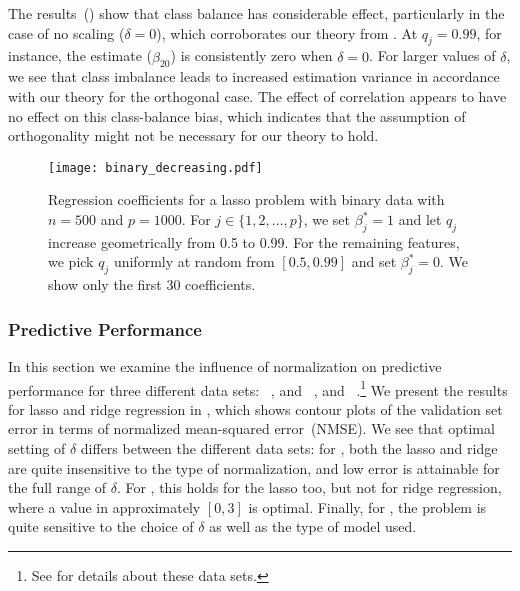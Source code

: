 The results~() show that class balance has considerable effect,
particularly in the case of no scaling (\(\delta = 0\)), which corroborates our theory from
. At \(q_j=0.99\), for instance, the estimate
(\(\hat{\beta}_{20}\)) is consistently zero when \(\delta = 0\). For larger values of
\(\delta\), we see that class imbalance leads to increased estimation variance in
accordance with our theory for the orthogonal case. The effect of correlation appears to
have no effect on this class-balance bias, which indicates that the assumption of
orthogonality might not be necessary for our theory to hold.

\begin{figure}[htpb]
  \centering
  \texttt{[image: binary\_decreasing.pdf]}
  \caption{%
    Regression coefficients for a lasso problem with binary data with \(n = 500\) and \(p =
    \num{1000}\). For \(j \in \{1,2,\dots,p\}\), we set \(\beta_j^* = 1\) and
    let \(q_j\) increase geometrically from 0.5 to 0.99. For the remaining features,
    we pick \(q_j\) uniformly at random from \([0.5, 0.99]\) and
    set \(\beta_j^* = 0\). We show only the first 30 coefficients.
  }
  \label{fig:binary-decreasing}
\end{figure}

\subsubsection{Predictive Performance}
\label{sec:experiments-predictive-performance}

In this section we examine the influence of normalization on predictive performance for
three different data sets: ~\citep{rhee2006}, and
~\citep{chen2004}, and
~\citep{hirst1994,king1995}.\footnote{See  for
  details about these data sets.} We present the results for lasso and ridge regression in
, which shows contour plots of the validation set error in
terms of normalized mean-squared error~(NMSE). We see that optimal setting of \(\delta\)
differs between the different data sets: for , both the lasso and ridge
are quite insensitive to the type of normalization, and low error is attainable for the
full range of \(\delta\). For , this holds for the lasso too, but not for
ridge regression, where a value in approximately \([0,3]\) is optimal. Finally, for
, the problem is quite sensitive to the choice of \(\delta\) as well as the
type of model used.

